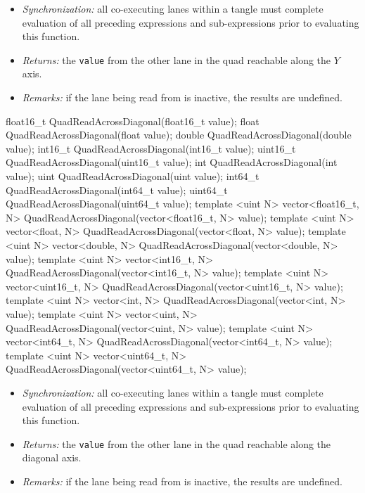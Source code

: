 \begin{itemize}
  \item \textit{Synchronization:} all co-executing \gls{lane}s within a \gls{tangle}
  must complete evaluation of all preceding expressions and sub-expressions
  prior to evaluating this function.
  \item \textit{Returns:} the \texttt{value} from the other \gls{lane} in the
  \gls{quad} reachable along the $Y$ axis.
  \item \textit{Remarks:} if the \gls{lane} being read from is inactive, the
  results are undefined.
\end{itemize}

\begin{HLSL}
float16_t QuadReadAcrossDiagonal(float16_t value);
float QuadReadAcrossDiagonal(float value);
double QuadReadAcrossDiagonal(double value);
int16_t QuadReadAcrossDiagonal(int16_t value);
uint16_t QuadReadAcrossDiagonal(uint16_t value);
int QuadReadAcrossDiagonal(int value);
uint QuadReadAcrossDiagonal(uint value);
int64_t QuadReadAcrossDiagonal(int64_t value);
uint64_t QuadReadAcrossDiagonal(uint64_t value);
template <uint N> vector<float16_t, N> QuadReadAcrossDiagonal(vector<float16_t, N> value);
template <uint N> vector<float, N> QuadReadAcrossDiagonal(vector<float, N> value);
template <uint N> vector<double, N> QuadReadAcrossDiagonal(vector<double, N> value);
template <uint N> vector<int16_t, N> QuadReadAcrossDiagonal(vector<int16_t, N> value);
template <uint N> vector<uint16_t, N> QuadReadAcrossDiagonal(vector<uint16_t, N> value);
template <uint N> vector<int, N> QuadReadAcrossDiagonal(vector<int, N> value);
template <uint N> vector<uint, N> QuadReadAcrossDiagonal(vector<uint, N> value);
template <uint N> vector<int64_t, N> QuadReadAcrossDiagonal(vector<int64_t, N> value);
template <uint N> vector<uint64_t, N> QuadReadAcrossDiagonal(vector<uint64_t, N> value);
\end{HLSL}

\begin{itemize}
  \item \textit{Synchronization:} all co-executing \gls{lane}s within a \gls{tangle}
  must complete evaluation of all preceding expressions and sub-expressions
  prior to evaluating this function.
  \item \textit{Returns:} the \texttt{value} from the other \gls{lane} in the
  \gls{quad} reachable along the diagonal axis.
  \item \textit{Remarks:} if the \gls{lane} being read from is inactive, the
  results are undefined.
\end{itemize}

